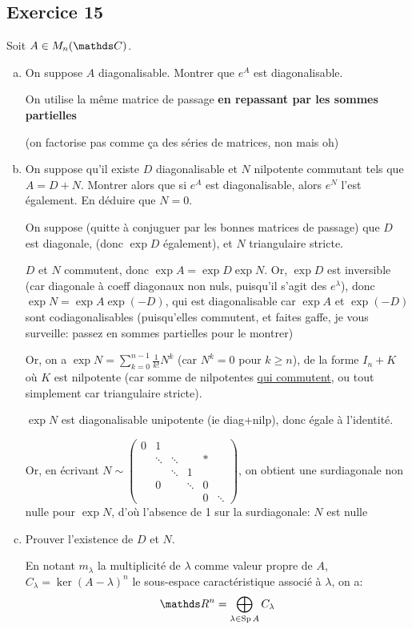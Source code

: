 \documentclass[a4paper, 12pt]{article}
\begin{document}
	\subsection*{Exercice 15}
	Soit $A\in M_n(\C)$.
	\begin{enumerate}[a)]
		\item On suppose $A$ diagonalisable. Montrer que $e^A$ est diagonalisable.
		\begin{corr}
			On utilise la même matrice de passage \textbf{en repassant par les sommes partielles}
			
			(on factorise pas comme ça des séries de matrices, non mais oh)
		\end{corr}
		\item On suppose qu'il existe $D$ diagonalisable et $N$ nilpotente commutant tels que $A=D+N$. Montrer alors que si $e^A$ est diagonalisable, alors $e^N$ l'est également. En déduire que $N=0$.
		\begin{corr}
			On suppose (quitte à conjuguer par les bonnes matrices de passage) que $D$ est diagonale, (donc $\exp D$ également), et $N$ triangulaire stricte.
			
			$D$ et $N$ commutent, donc $\exp A = \exp D \exp N$.
			Or, $\exp D$ est inversible (car diagonale à coeff diagonaux non nuls, puisqu'il s'agit des $e^\lambda$), donc $\exp N  = \exp A \exp (-D)$, qui est diagonalisable car $\exp A$ et $\exp (-D)$ sont codiagonalisables (puisqu'elles commutent, et faites gaffe, je vous surveille: passez en sommes partielles pour le montrer)

			Or, on a $\displaystyle \exp N = \sum_{k=0}^{n-1} \frac 1 {k!} N^k$ (car $N^k=0$ pour $k\geqslant n$), de la forme $I_n+K$ où $K$ est nilpotente (car somme de nilpotentes \underline{qui commutent}, ou tout simplement car triangulaire stricte).
			
			$\exp N$ est diagonalisable unipotente (ie diag+nilp), donc égale à l'identité.
			
			Or, en écrivant $N \sim \begin{pmatrix}
				0 & 1 & & &\\
				& \ddots & \ddots & & * \\
				& & \ddots & 1 \\
				& 0 &  & \ddots & 0 \\
				& & & & 0 & \ddots
			\end{pmatrix}$, on obtient une surdiagonale non nulle pour $\exp N$, d'où l'absence de 1 sur la surdiagonale: $N$ est nulle
		\end{corr}
		\item Prouver l'existence de $D$ et $N$.
		\begin{corr}
			En notant $m_\lambda$ la multiplicité de $\lambda$ comme valeur propre de $A$, $C_\lambda = \ker (A-\lambda)^n$ le sous-espace caractéristique associé à $\lambda$, on a:
			$$ \R^n = \bigoplus_{\lambda\in \Sp A} C_\lambda $$
			

\end{corr}
\end{enumerate}
\end{document}
